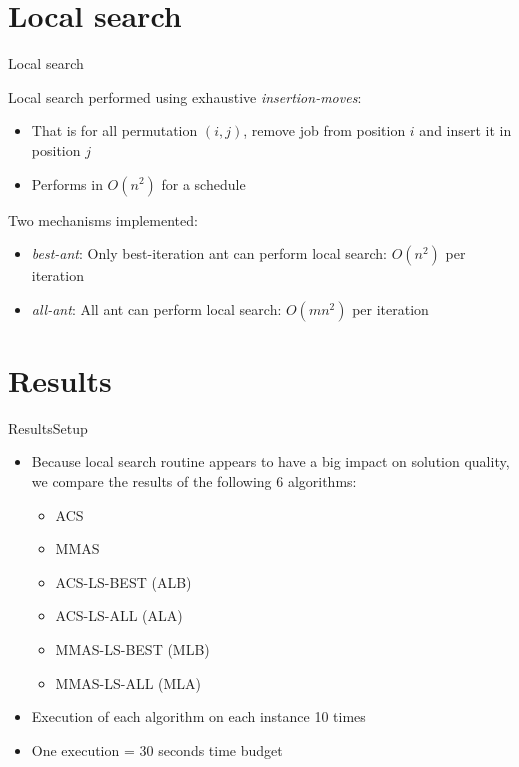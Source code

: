 \documentclass[10pt]{beamer}
\begin{document}
\section{Local search}

\begin{frame}{Local search}{}

Local search performed using exhaustive \textit{insertion-moves}:

\begin{itemize}
  \item That is for all permutation $(i, j)$, remove job from position $i$ and insert it in position $j$
  \item Performs in $O(n^2)$ for a schedule
\end{itemize}



Two mechanisms implemented:

\begin{itemize}
  \item \textit{best-ant}: Only best-iteration ant can perform local search: $O(n^2)$ per iteration
  \item \textit{all-ant}: All ant can perform local search: $O(mn^2)$ per iteration
\end{itemize}

\end{frame}

\section{Results}

\begin{frame}{Results}{Setup}

\begin{itemize}
  \item Because local search routine appears to have a big impact on solution quality, we compare the results of the following 6 algorithms:
  \begin{itemize}
    \item ACS
    \item MMAS
    \item ACS-LS-BEST (ALB)
    \item ACS-LS-ALL (ALA)
    \item MMAS-LS-BEST (MLB)
    \item MMAS-LS-ALL (MLA)
  \end{itemize}
  \item Execution of each algorithm on each instance 10 times
  \item One execution = 30 seconds time budget
\end{itemize}

\end{frame}
\end{document}
